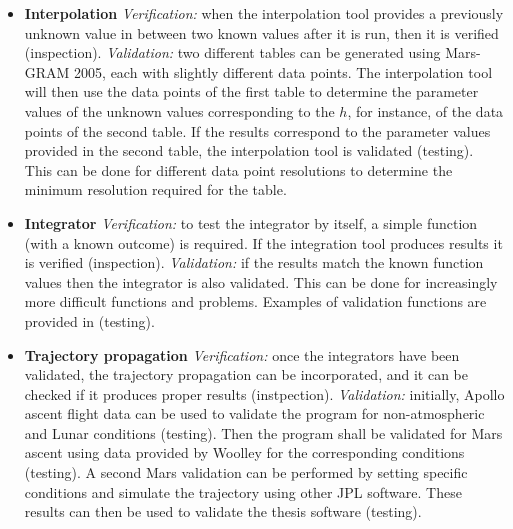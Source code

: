 \begin{itemize}
\item \textbf{Interpolation} \textit{Verification:} when the interpolation tool provides a previously unknown value in between two known values after it is run, then it is verified (inspection). \textit{Validation:} two different tables can be generated using Mars-\ac{GRAM} 2005, each with slightly different data points. The interpolation tool will then use the data points of the first table to determine the parameter values of the unknown values corresponding to the $h$, for instance, of the data points of the second table. If the results correspond to the parameter values provided in the second table, the interpolation tool is validated (testing). This can be done for different data point resolutions to determine the minimum resolution required for the table.
\item \textbf{Integrator} \textit{Verification:} to test the integrator by itself, a simple function (with a known outcome) is required. If the integration tool produces results it is verified (inspection). \textit{Validation:} if the results match the known function values then the integrator is also validated. This can be done for increasingly more difficult functions and problems. Examples of validation functions are provided in \cite{noomen2013int} (testing).
\item \textbf{Trajectory propagation} \textit{Verification:} once the integrators have been validated, the trajectory propagation can be incorporated, and it can be checked if it produces proper results (instpection). \textit{Validation:} initially, Apollo ascent flight data \cite{apollo1971} can be used to validate the program for non-atmospheric and Lunar conditions (testing). Then the program shall be validated for Mars ascent using data provided by Woolley \cite{woolley2011mars} for the corresponding conditions (testing). A second Mars validation can be performed by setting specific conditions and simulate the trajectory using other \ac{JPL} software. These results can then be used to validate the thesis software (testing). 

\end{itemize}
